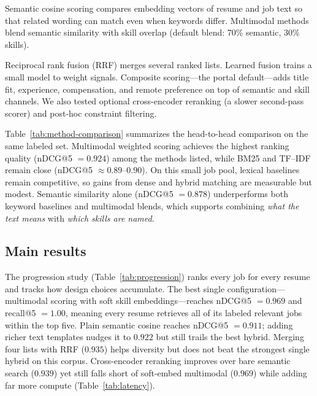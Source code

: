 Semantic cosine scoring compares embedding vectors of resume and job text so that related wording can match even when keywords differ.
Multimodal methods blend semantic similarity with skill overlap (default blend: 70\% semantic, 30\% skills).

Reciprocal rank fusion (RRF) merges several ranked lists.
Learned fusion trains a small model to weight signals.
Composite scoring---the portal default---adds title fit, experience, compensation, and remote preference on top of semantic and skill channels.
We also tested optional cross-encoder reranking (a slower second-pass scorer) and post-hoc constraint filtering.

Table~\ref{tab:method-comparison} summarizes the head-to-head comparison on the same labeled set.
Multimodal weighted scoring achieves the highest ranking quality (nDCG@5 $= 0.924$) among the methods listed, while BM25 and TF--IDF remain close (nDCG@5 $\approx 0.89$--$0.90$).
On this small job pool, lexical baselines remain competitive, so gains from dense and hybrid matching are measurable but modest.
Semantic similarity alone (nDCG@5 $= 0.878$) underperforms both keyword baselines and multimodal blends, which supports combining \emph{what the text means} with \emph{which skills are named}.

\begin{JTable}

\end{JTable}

\subsection{Main results}\label{sec:6-main-result}\label{sec:6-progression}\label{sec:6-fusion}

The progression study (Table~\ref{tab:progression}) ranks every job for every resume and tracks how design choices accumulate.
The best single configuration---multimodal scoring with soft skill embeddings---reaches nDCG@5 $= 0.969$ and recall@5 $= 1.00$, meaning every resume retrieves all of its labeled relevant jobs within the top five.
Plain semantic cosine reaches nDCG@5 $= 0.911$; adding richer text templates nudges it to $0.922$ but still trails the best hybrid.
Merging four lists with RRF ($0.935$) helps diversity but does not beat the strongest single hybrid on this corpus.
Cross-encoder reranking improves over bare semantic search ($0.939$) yet still falls short of soft-embed multimodal ($0.969$) while adding far more compute (Table~\ref{tab:latency}).

